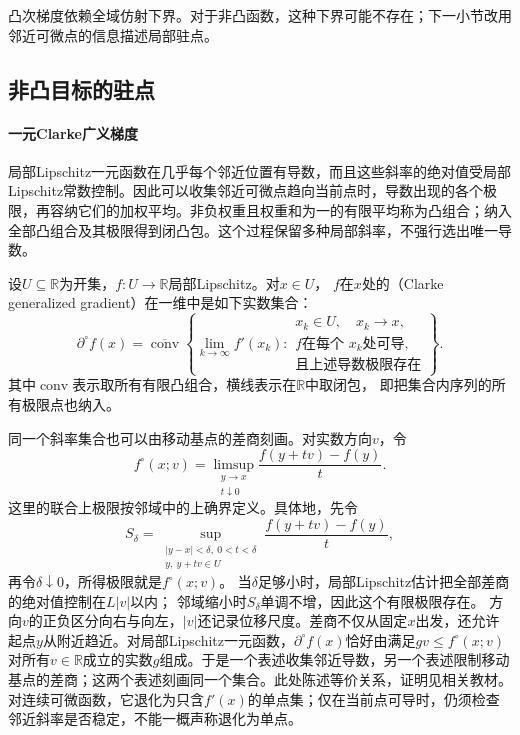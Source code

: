 凸次梯度依赖全域仿射下界。对于非凸函数，这种下界可能不存在；下一小节改用邻近可微点的信息描述局部驻点。

\subsection{非凸目标的驻点}
\label{sec:analysis-nonsmooth-surrogate-gradient}
\paragraph{一元Clarke广义梯度}

局部Lipschitz一元函数在几乎每个邻近位置有导数，而且这些斜率的绝对值受局部Lipschitz常数控制。因此可以收集邻近可微点趋向当前点时，导数出现的各个极限，再容纳它们的加权平均。非负权重且权重和为一的有限平均称为凸组合；纳入全部凸组合及其极限得到闭凸包。这个过程保留多种局部斜率，不强行选出唯一导数。

\begin{definition}[一维Clarke广义梯度]
\label{def:analysis-clarke-generalized-gradient}
设$U\subseteq\mathbb R$为开集，$f:U\to\mathbb R$局部Lipschitz。对$x\in U$，
$f$在$x$处的（Clarke generalized gradient）在一维中是如下实数集合：
\[
  \partial^\circ f(x)
  =
  \overline{\operatorname{conv}}
  \left\{
    \lim_{k\to\infty}f'(x_k):
    \begin{array}{l}
      x_k\in U,\quad x_k\to x,\\
      f\text{在每个 }x_k\text{处可导},\\
      \text{且上述导数极限存在}
    \end{array}
  \right\}.
\]
其中$\operatorname{conv}$表示取所有有限凸组合，横线表示在$\mathbb R$中取闭包，
即把集合内序列的所有极限点也纳入。
\end{definition}

同一个斜率集合也可以由移动基点的差商刻画。对实数方向$v$，令
\[
 f^\circ(x;v)=\limsup_{\substack{y\to x\\t\downarrow0}}
 \frac{f(y+tv)-f(y)}t.
\]
这里的联合上极限按邻域中的上确界定义。具体地，先令
\[
 S_\delta=
 \sup_{\substack{|y-x|<\delta,\ 0<t<\delta\\y,\ y+tv\in U}}
 \frac{f(y+tv)-f(y)}t,
\]
再令$\delta\downarrow0$，所得极限就是$f^\circ(x;v)$。
当$\delta$足够小时，局部Lipschitz估计把全部差商的绝对值控制在$L|v|$以内；
邻域缩小时$S_\delta$单调不增，因此这个有限极限存在。
方向$v$的正负区分向右与向左，$|v|$还记录位移尺度。差商不仅从固定$x$出发，还允许起点$y$从附近趋近。对局部Lipschitz一元函数，$\partial^\circ f(x)$恰好由满足$gv\leq f^\circ(x;v)$对所有$v\in\mathbb R$成立的实数$g$组成。于是一个表述收集邻近导数，另一个表述限制移动基点的差商；这两个表述刻画同一个集合。此处陈述等价关系，证明见相关教材。
对连续可微函数，它退化为只含$f'(x)$的单点集；仅在当前点可导时，仍须检查邻近斜率是否稳定，不能一概声称退化为单点。

